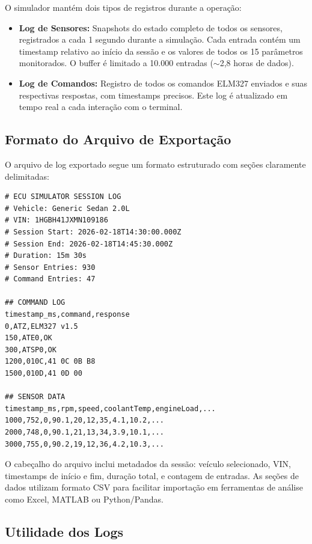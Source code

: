 O simulador mantém dois tipos de registros durante a operação:

\begin{itemize}
    \item \textbf{Log de Sensores:} Snapshots do estado completo de todos os sensores, registrados a cada 1 segundo durante a simulação. Cada entrada contém um timestamp relativo ao início da sessão e os valores de todos os 15 parâmetros monitorados. O buffer é limitado a 10.000 entradas ($\sim$2,8 horas de dados).
    
    \item \textbf{Log de Comandos:} Registro de todos os comandos ELM327 enviados e suas respectivas respostas, com timestamps precisos. Este log é atualizado em tempo real a cada interação com o terminal.
\end{itemize}

\subsection{Formato do Arquivo de Exportação}

O arquivo de log exportado segue um formato estruturado com seções claramente delimitadas:

\begin{lstlisting}[caption={Exemplo de arquivo de log exportado.}, label={lst:log-format}]
# ECU SIMULATOR SESSION LOG
# Vehicle: Generic Sedan 2.0L
# VIN: 1HGBH41JXMN109186
# Session Start: 2026-02-18T14:30:00.000Z
# Session End: 2026-02-18T14:45:30.000Z
# Duration: 15m 30s
# Sensor Entries: 930
# Command Entries: 47

## COMMAND LOG
timestamp_ms,command,response
0,ATZ,ELM327 v1.5
150,ATE0,OK
300,ATSP0,OK
1200,010C,41 0C 0B B8
1500,010D,41 0D 00

## SENSOR DATA
timestamp_ms,rpm,speed,coolantTemp,engineLoad,...
1000,752,0,90.1,20,12,35,4.1,10.2,...
2000,748,0,90.1,21,13,34,3.9,10.1,...
3000,755,0,90.2,19,12,36,4.2,10.3,...
\end{lstlisting}

O cabeçalho do arquivo inclui metadados da sessão: veículo selecionado, VIN, timestamps de início e fim, duração total, e contagem de entradas. As seções de dados utilizam formato CSV para facilitar importação em ferramentas de análise como Excel, MATLAB ou Python/Pandas.

\subsection{Utilidade dos Logs}

